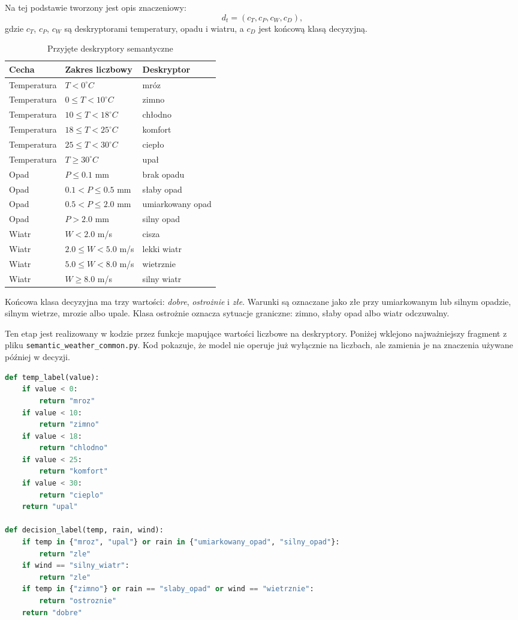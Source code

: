 \documentclass[a4paper,12pt]{article}
\begin{document}
Na tej podstawie tworzony jest opis znaczeniowy:
\[
    d_t = (c_T, c_P, c_W, c_D),
\]
gdzie \(c_T\), \(c_P\), \(c_W\) są deskryptorami temperatury, opadu i wiatru,
a \(c_D\) jest końcową klasą decyzyjną.

\begin{table}[h]
\centering
\caption{Przyjęte deskryptory semantyczne}
\begin{tabular}{lll}
\toprule
Cecha & Zakres liczbowy & Deskryptor \\
\midrule
Temperatura & \(T < 0^\circ C\) & mróz \\
Temperatura & \(0 \leq T < 10^\circ C\) & zimno \\
Temperatura & \(10 \leq T < 18^\circ C\) & chłodno \\
Temperatura & \(18 \leq T < 25^\circ C\) & komfort \\
Temperatura & \(25 \leq T < 30^\circ C\) & ciepło \\
Temperatura & \(T \geq 30^\circ C\) & upał \\
\midrule
Opad & \(P \leq 0.1\) mm & brak opadu \\
Opad & \(0.1 < P \leq 0.5\) mm & słaby opad \\
Opad & \(0.5 < P \leq 2.0\) mm & umiarkowany opad \\
Opad & \(P > 2.0\) mm & silny opad \\
\midrule
Wiatr & \(W < 2.0\) m/s & cisza \\
Wiatr & \(2.0 \leq W < 5.0\) m/s & lekki wiatr \\
Wiatr & \(5.0 \leq W < 8.0\) m/s & wietrznie \\
Wiatr & \(W \geq 8.0\) m/s & silny wiatr \\
\bottomrule
\end{tabular}
\end{table}

Końcowa klasa decyzyjna ma trzy wartości: \textit{dobre}, \textit{ostrożnie}
i \textit{złe}. Warunki są oznaczane jako złe przy umiarkowanym lub silnym
opadzie, silnym wietrze, mrozie albo upale. Klasa ostrożnie oznacza sytuacje
graniczne: zimno, słaby opad albo wiatr odczuwalny.

Ten etap jest realizowany w kodzie przez funkcje mapujące wartości liczbowe na
deskryptory. Poniżej wklejono najważniejszy fragment z pliku
\texttt{semantic\_weather\_common.py}. Kod pokazuje, że model nie operuje już
wyłącznie na liczbach, ale zamienia je na znaczenia używane później w decyzji.

\begin{lstlisting}[language=Python]
def temp_label(value):
    if value < 0:
        return "mroz"
    if value < 10:
        return "zimno"
    if value < 18:
        return "chlodno"
    if value < 25:
        return "komfort"
    if value < 30:
        return "cieplo"
    return "upal"

def decision_label(temp, rain, wind):
    if temp in {"mroz", "upal"} or rain in {"umiarkowany_opad", "silny_opad"}:
        return "zle"
    if wind == "silny_wiatr":
        return "zle"
    if temp in {"zimno"} or rain == "slaby_opad" or wind == "wietrznie":
        return "ostroznie"
    return "dobre"
\end{lstlisting}
\end{document}

